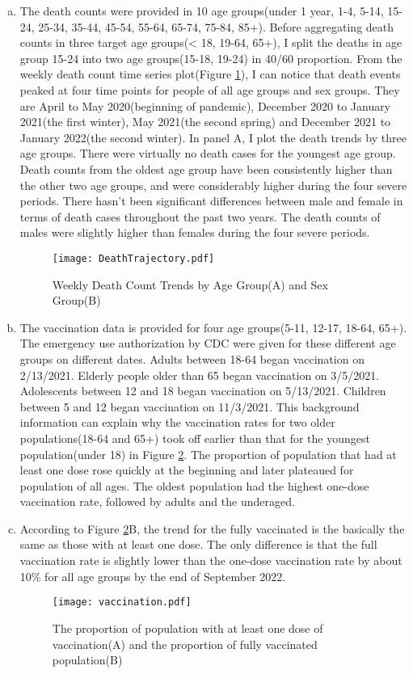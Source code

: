 \documentclass[12pt]{article}
\begin{document}
\begin{enumerate}[(a)]
	\item  The death counts were provided in 10 age groups(under 1 year, 1-4, 5-14, 15-24, 25-34, 35-44, 45-54, 55-64, 65-74, 75-84, 85+). Before aggregating death counts in three target age groups(< 18, 19-64, 65+), I split the deaths in age group 15-24 into two age groups(15-18, 19-24) in 40/60 proportion. From the weekly death count time series plot(Figure \ref{weekdeath}), I can notice that death events peaked at four time points for people of all age groups and sex groups. They are April to May 2020(beginning of pandemic), December 2020 to January 2021(the first winter), May 2021(the second spring) and December 2021 to January 2022(the second winter). In panel A, I plot the death trends by three age groups. There were virtually no death cases for the youngest age group. Death counts from the oldest age group have been consistently higher than the other two age groups, and were considerably higher during the four severe periods. There hasn't been significant differences between male and female in terms of death cases throughout the past two years. The death counts of males were slightly higher than females during the four severe periods.
	\begin{figure}[htbp]
		\centering
		\texttt{[image: DeathTrajectory.pdf]}
		\caption{Weekly Death Count Trends by Age Group(A) and Sex Group(B)}\label{weekdeath}
	\end{figure} 
	
	\item The vaccination data is provided for four age groups(5-11, 12-17, 18-64, 65+). The emergency use authorization by CDC were given for these different age groups on different dates. Adults between 18-64 began vaccination on 2/13/2021. Elderly people older than 65 began vaccination on 3/5/2021. Adolescents between 12 and 18 began vaccination on 5/13/2021. Children between 5 and 12 began vaccination on 11/3/2021. This background information can explain why the vaccination rates for two older populations(18-64 and 65+) took off earlier than that for the youngest population(under 18) in Figure \ref{vaccinationplot}. The proportion of population that had at least one dose rose quickly at the beginning and later plateaued for population of all ages. The oldest population had the highest one-dose vaccination rate, followed by adults and the underaged.
	
	\item According to Figure \ref{vaccinationplot}B, the trend for the fully vaccinated is the basically the same as those with at least one dose. The only difference is that the full vaccination rate is slightly lower than the one-dose vaccination rate by about 10\% for all age groups by the end of September 2022.
	
	\begin{figure}[htbp]
		\centering
		\texttt{[image: vaccination.pdf]}
		\caption{The proportion of population with at least one dose of vaccination(A) and the proportion of fully vaccinated population(B)}\label{vaccinationplot}
	\end{figure}
\end{enumerate}
\end{document}
